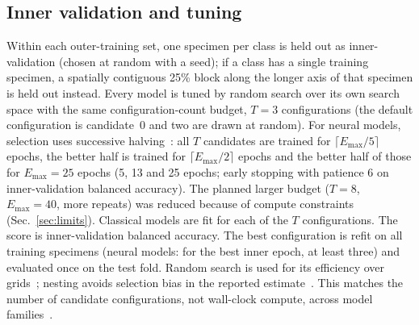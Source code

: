 \documentclass[journal]{IEEEtran}
\begin{document}
\subsection{Inner validation and tuning}
Within each outer-training set, one specimen per class is held out as inner-validation (chosen at random with a seed); if a class has a single training specimen, a spatially contiguous 25\% block along the longer axis of that specimen is held out instead. Every model is tuned by random search over its own search space with the same configuration-count budget, $T=3$ configurations (the default configuration is candidate~0 and two are drawn at random). For neural models, selection uses successive halving~\cite{jamieson2016successive,li2018hyperband}: all $T$ candidates are trained for $\lceil E_{\max}/5\rceil$ epochs, the better half is trained for $\lceil E_{\max}/2\rceil$ epochs and the better half of those for $E_{\max}=25$ epochs (5, 13 and 25 epochs; early stopping with patience 6 on inner-validation balanced accuracy). The planned larger budget ($T=8$, $E_{\max}=40$, more repeats) was reduced because of compute constraints (Sec.~\ref{sec:limits}). Classical models are fit for each of the $T$ configurations. The score is inner-validation balanced accuracy. The best configuration is refit on all training specimens (neural models: for the best inner epoch, at least three) and evaluated once on the test fold. Random search is used for its efficiency over grids~\cite{bergstra2012random}; nesting avoids selection bias in the reported estimate~\cite{cawley2010overfitting}. This matches the number of candidate configurations, not wall-clock compute, across model families~\cite{gulrajani2021domainbed}.
\end{document}

